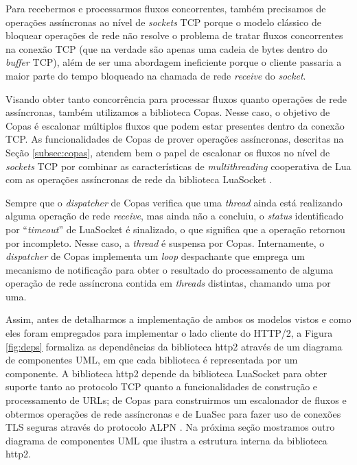 Para recebermos e processarmos fluxos concorrentes, também precisamos de operações assíncronas ao nível de {\em sockets} TCP porque o modelo clássico de bloquear operações de rede não resolve o problema de tratar fluxos concorrentes na conexão TCP (que na verdade são apenas uma cadeia de bytes dentro do {\em buffer} TCP), além de ser uma abordagem ineficiente porque o cliente passaria a maior parte do tempo bloqueado na chamada de rede {\em receive} do {\em socket}.

Visando obter tanto concorrência para processar fluxos quanto operações de rede assíncronas, também utilizamos a biblioteca Copas. Nesse caso, o objetivo de Copas é escalonar múltiplos fluxos que podem estar presentes dentro da conexão TCP. As funcionalidades de Copas de prover operações assíncronas, descritas na Seção \ref{subsec:copas}, atendem bem o papel de escalonar os fluxos no nível de {\em sockets} TCP por combinar as características de {\em multithreading} cooperativa de Lua com as operações assíncronas de rede da biblioteca LuaSocket \cite{Nehab2007}.

Sempre que o {\em dispatcher} de Copas verifica que uma {\em thread} ainda está realizando alguma operação de rede {\em receive}, mas ainda não a concluiu, o {\em status} identificado por ``{\em timeout}'' de LuaSocket é sinalizado, o que significa que a operação retornou por incompleto. Nesse caso, a {\em thread} é suspensa por Copas. Internamente, o {\em dispatcher} de Copas implementa um {\em loop} despachante que emprega um mecanismo de notificação para obter o resultado do processamento de alguma operação de rede assíncrona contida em {\em threads} distintas, chamando uma por uma.

Assim, antes de detalharmos a implementação de ambos os modelos vistos e como eles foram empregados para implementar o lado cliente do HTTP/2, a Figura \ref{fig:deps} formaliza as dependências da biblioteca http2 através de um diagrama de componentes UML, em que cada biblioteca é representada por um componente. A biblioteca http2 depende da biblioteca LuaSocket para obter suporte tanto ao protocolo TCP quanto a funcionalidades de construção e processamento de URLs; de Copas para construirmos um escalonador de fluxos e obtermos operações de rede assíncronas e de LuaSec \cite{silvestre2018luasec} para fazer uso de conexões TLS seguras através do protocolo ALPN \cite{FriedlRFC7301}. Na próxima seção mostramos outro diagrama de componentes UML que ilustra a estrutura interna da biblioteca http2.

